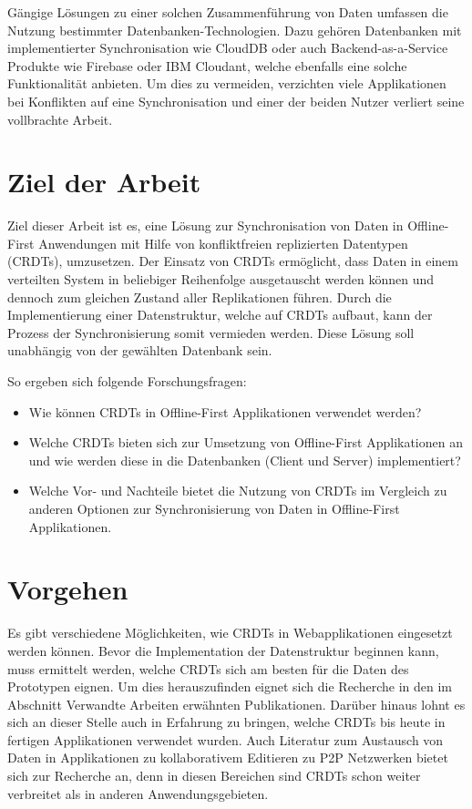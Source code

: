 \documentclass[a4paper, 12pt]{scrreprt}
\begin{document}
Gängige Lösungen zu einer solchen Zusammenführung von Daten umfassen die Nutzung bestimmter Datenbanken-Technologien. Dazu gehören Datenbanken mit implementierter Synchronisation wie CloudDB oder auch Backend-as-a-Service Produkte wie Firebase oder IBM Cloudant, welche ebenfalls eine solche Funktionalität anbieten. Um dies zu vermeiden, verzichten viele Applikationen bei Konflikten auf eine Synchronisation und einer der beiden Nutzer verliert seine vollbrachte Arbeit.

\section{Ziel der Arbeit} 

Ziel dieser Arbeit ist es, eine Lösung zur Synchronisation von Daten in Offline-First Anwendungen mit Hilfe von konfliktfreien replizierten Datentypen (CRDTs), umzusetzen. Der Einsatz von CRDTs ermöglicht, dass Daten in einem verteilten System in beliebiger Reihenfolge ausgetauscht werden können und dennoch zum gleichen Zustand aller Replikationen führen. Durch die Implementierung einer Datenstruktur, welche auf CRDTs aufbaut, kann der Prozess der Synchronisierung somit vermieden werden. Diese Lösung soll unabhängig von der gewählten Datenbank sein.

So ergeben sich folgende Forschungsfragen:

\begin{itemize}
	\item Wie können CRDTs in Offline-First Applikationen verwendet werden?
	\item Welche CRDTs bieten sich zur Umsetzung von Offline-First Applikationen an und wie werden diese in die Datenbanken (Client und Server) implementiert?
	\item Welche Vor- und Nachteile bietet die Nutzung von CRDTs im Vergleich zu anderen Optionen zur Synchronisierung von Daten in Offline-First Applikationen.
\end{itemize}

\section{Vorgehen}
Es gibt verschiedene Möglichkeiten, wie CRDTs in Webapplikationen eingesetzt werden können. Bevor die Implementation der Datenstruktur beginnen kann, muss ermittelt werden, welche CRDTs sich am besten für die Daten des Prototypen eignen. Um dies herauszufinden eignet sich die Recherche in den im Abschnitt Verwandte Arbeiten erwähnten Publikationen. Darüber hinaus lohnt es sich an dieser Stelle auch in Erfahrung zu bringen, welche CRDTs bis heute in fertigen Applikationen verwendet wurden. Auch Literatur zum Austausch von Daten in Applikationen zu kollaborativem Editieren zu P2P Netzwerken bietet sich zur Recherche an, denn in diesen Bereichen sind CRDTs schon weiter verbreitet als in anderen Anwendungsgebieten.
\end{document}
